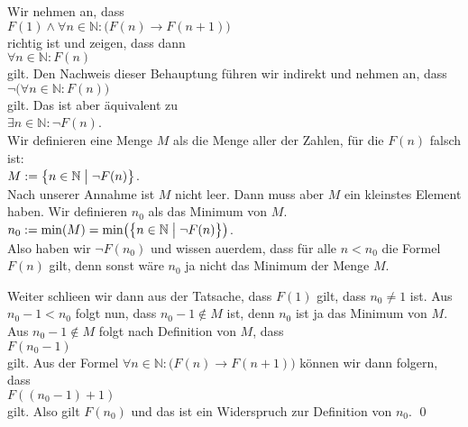 \proof
Wir nehmen an, dass
\\[0.2cm]
\hspace*{1.3cm}
$F(1) \wedge \forall n \in \mathbb{N}:\bigl(F(n) \rightarrow F(n+1)\bigr)$
\\[0.2cm]
richtig ist und zeigen, dass dann
\\[0.2cm]
\hspace*{1.3cm}
$\forall n \in \mathbb{N}:F(n)$
\\[0.2cm]
gilt.  Den Nachweis dieser Behauptung f\"{u}hren wir indirekt und nehmen an, dass
\\[0.2cm]
\hspace*{1.3cm}
$\neg\bigl(\forall n \in \mathbb{N}:F(n)\bigr)$
\\[0.2cm]
gilt.  Das ist aber \"{a}quivalent zu
\\[0.2cm]
\hspace*{1.3cm}
$\exists n \in \mathbb{N}:\neg F(n)$.
\\[0.2cm]
Wir definieren eine Menge $M$ als die Menge aller der Zahlen, f\"{u}r die $F(n)$ falsch ist:
\\[0.2cm]
\hspace*{1.3cm}
$M := \bigl\{ n \in \mathbb{N} \bigm| \neg F(n) \bigr\}$.
\\[0.2cm]
Nach unserer Annahme ist $M$ nicht leer.  Dann muss aber $M$ ein kleinstes Element haben.  Wir definieren
$n_0$ als das Minimum von $M$.
\\[0.2cm]
\hspace*{1.3cm}
$n_0 := \min( M) = \min\bigl(\bigl\{ n \in \mathbb{N} \bigm| \neg F(n) \bigr\}\bigr)$.
\\[0.2cm]
Also haben wir $\neg F(n_0)$ und wissen au\3erdem, dass f\"{u}r alle $n < n_0$ die Formel $F(n)$ gilt, denn
sonst w\"{a}re $n_0$ ja nicht das Minimum der Menge $M$.

Weiter schlie\3en wir dann aus der Tatsache, dass $F(1)$ gilt, dass $n_0 \not= 1$ ist.  
Aus $n_0 -1 < n_0$ folgt nun, dass $n_0-1 \not\in M$ ist, denn $n_0$ ist ja das Minimum von $M$.
Aus  $n_0-1 \not\in M$ folgt nach Definition von $M$, dass
\\[0.2cm]
\hspace*{1.3cm}
$F(n_0 - 1)$
\\[0.2cm]
gilt.  Aus der Formel $\forall n \in \mathbb{N}:\bigl( F(n) \rightarrow F(n+1)\bigr)$ k\"{o}nnen wir dann folgern, dass
\\[0.2cm]
\hspace*{1.3cm}
$F((n_0-1) +1)$
\\[0.2cm] 
gilt.  Also gilt $F(n_0)$ und das ist ein Widerspruch zur Definition von $n_0$. \qed


